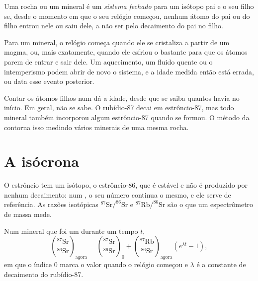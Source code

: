 \begin{definition}\label{def:g12:age-of-the-earth:closed-system}
Uma rocha ou um mineral é um \emph{sistema fechado}
para um isótopo pai e o seu filho se, desde o momento em que o seu relógio
começou, nenhum átomo do pai ou do filho entrou nele ou saiu dele, a não ser
pelo decaimento do pai no filho.
\end{definition}

Para um mineral, o relógio começa quando ele se cristaliza a partir de um
magma, ou, mais exatamente, quando ele esfriou o bastante para que os átomos
parem de entrar e sair dele. Um aquecimento, um fluido quente
ou o intemperismo podem abrir de novo o sistema, e a idade medida então
está errada, ou data esse evento posterior.

Contar os átomos filhos num  dá a idade, desde que se saiba
quantos havia no início. Em geral, não se sabe. O rubídio-87 decai em
estrôncio-87, mas todo mineral também incorporou algum estrôncio-87 quando
se formou. O método da  contorna isso medindo vários minerais de uma
mesma rocha.

\section{A isócrona}

O estrôncio tem um isótopo, o estrôncio-86, que é estável e não é produzido
por nenhum decaimento: num , o seu número continua o mesmo, e
ele serve de referência. As razões isotópicas $^{87}\mathrm{Sr}/^{86}\mathrm{Sr}$ e
$^{87}\mathrm{Rb}/^{86}\mathrm{Sr}$ são o que um espectrômetro de massa mede.

\begin{theorem}\label{thm:g12:age-of-the-earth:isochron}
Num mineral que foi um  durante um tempo $t$,
\[
  \left(\frac{^{87}\mathrm{Sr}}{^{86}\mathrm{Sr}}\right)_{\text{agora}}
  = \left(\frac{^{87}\mathrm{Sr}}{^{86}\mathrm{Sr}}\right)_{0}
  + \left(\frac{^{87}\mathrm{Rb}}{^{86}\mathrm{Sr}}\right)_{\text{agora}}
  \left(e^{\lambda t} - 1\right),
\]
em que o índice 0 marca o valor quando o relógio começou e $\lambda$ é a
constante de decaimento do rubídio-87.
\end{theorem}

